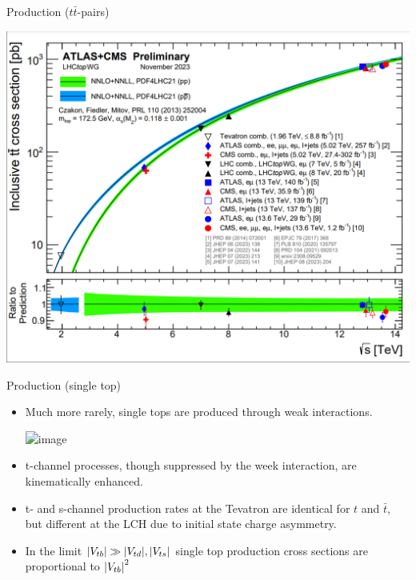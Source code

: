 \documentclass{beamer}
\begin{document}
\begin{frame}{Production ($t\bar{t}$-pairs)}
    \begin{center}
        \includegraphics[scale=.45]{images/top_pair_production_cross_section.PNG}
    \end{center}
\end{frame}

\begin{frame}{Production (single top)}
    \begin{itemize}
        \item<1-> Much more rarely, single tops are produced through weak interactions.
        \begin{center}
            \includegraphics<2->[scale=0.35]{images/single_top_production_diagrams.PNG}
        \end{center}
        \item<3-> t-channel processes, though suppressed by the week interaction, are kinematically enhanced.
        \item<4-> t- and s-channel production rates at the Tevatron are identical for $t$ and $\bar{t}$, but different at the LCH due to initial state charge asymmetry.
        \item<5-> In the limit $\abs{V_{tb}} \gg \abs{V_{td}}, \abs{V_{ts}}$ single top production cross sections are proportional to $\abs{V_{tb}}^2$
    \end{itemize}
\end{frame}
\end{document}
